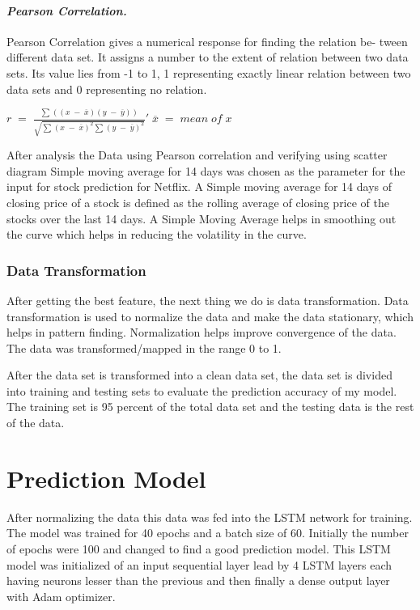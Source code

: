 \documentclass[5p,,preprint,12pt,twocolumn]{elsarticle}
\begin{document}
\paragraph{\textit{Pearson Correlation.}}Pearson Correlation gives a numerical response for finding the relation be- tween different data set. It assigns a number to the extent of relation between two data sets. Its value lies from -1 to 1, 1 representing exactly linear relation between two data sets and 0 representing no relation.

$r\;=\;\frac{\sum_{}((x\;-\;\overline x)(y\;-\;\overline y))}{\sqrt{{\displaystyle\sum_{}}(x\;-\;\overline x)^{2}{\displaystyle\sum_{}}(y\;-\;\overline y)^{2}}}'\;\overline x\;=\;mean\;of\;x $

After analysis the Data using Pearson correlation and verifying using scatter diagram Simple moving average for 14 days was chosen as the parameter for the input for stock prediction for Netflix. A Simple moving average for 14 days of closing price of a stock is defined as the rolling average of closing price of the stocks over the last 14 days. A Simple Moving Average helps in smoothing out the curve which helps in reducing the volatility in the curve.



\subsubsection{Data Transformation}After getting the best feature, the next thing we do is data transformation. Data transformation is used to normalize the data and make the data stationary, which helps in pattern finding. Normalization helps improve convergence of the data. The data was transformed/mapped in the range 0 to 1.

After the data set is transformed into a clean data set, the data set is divided into training and testing sets to evaluate the prediction accuracy of my model. The training set is 95 percent of the total data set and the testing data is the rest of the data.
    
\section{Prediction Model}
After normalizing the data this data was fed into the LSTM network for training. The model was trained for 40 epochs and a batch size of 60. Initially the number of epochs were 100 and changed to find a good prediction model. This LSTM model was initialized of an input sequential layer lead by 4 LSTM layers each having neurons lesser than the previous and then finally a dense output layer with Adam optimizer.
\end{document}
